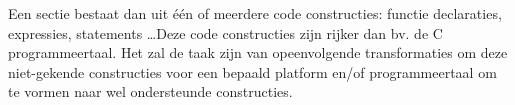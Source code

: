 Een sectie bestaat dan uit \'e\'en of meerdere code constructies: functie
declaraties, expressies, statements \dots Deze code constructies zijn rijker
dan bv. de C programmeertaal. Het zal de taak zijn van opeenvolgende
transformaties om deze niet-gekende constructies voor een bepaald platform
en/of programmeertaal om te vormen naar wel ondersteunde constructies.

